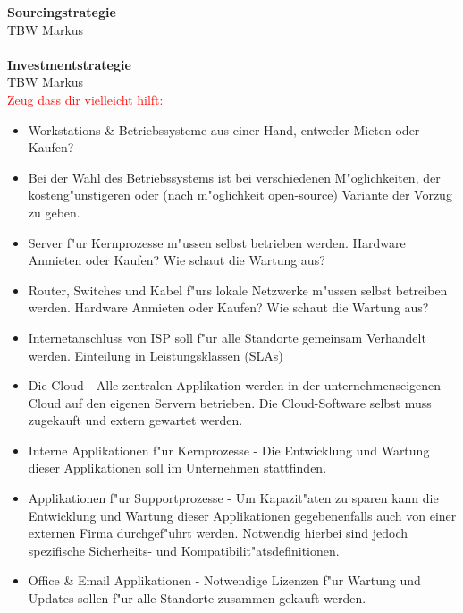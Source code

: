 \textbf{Sourcingstrategie}\\
TBW Markus\\\\

\textbf{Investmentstrategie}\\
TBW Markus\\

\textcolor{red}{Zeug dass dir vielleicht hilft:}\\

\begin{itemize}

	\item Workstations \& Betriebssysteme aus einer Hand, entweder Mieten oder Kaufen?

	\item Bei der Wahl des Betriebssystems ist bei verschiedenen M"oglichkeiten, der kosteng"unstigeren oder (nach m"oglichkeit open-source) Variante der Vorzug zu geben.
	
	\item Server f"ur Kernprozesse m"ussen selbst betrieben werden. Hardware Anmieten oder Kaufen? Wie schaut die Wartung aus?
	
	\item Router, Switches und Kabel f"urs lokale Netzwerke m"ussen selbst betreiben werden. Hardware Anmieten oder Kaufen? Wie schaut die Wartung aus?
	
	\item Internetanschluss von ISP soll f"ur alle Standorte gemeinsam Verhandelt werden. Einteilung in Leistungsklassen (SLAs)

	\item Die Cloud - Alle zentralen Applikation werden in der unternehmenseigenen Cloud auf den eigenen Servern betrieben. Die Cloud-Software selbst  muss zugekauft und extern gewartet werden.
	
	\item Interne Applikationen f"ur Kernprozesse - Die Entwicklung und Wartung dieser Applikationen soll im Unternehmen stattfinden.
	
	\item Applikationen f"ur Supportprozesse -  Um Kapazit"aten zu sparen kann die Entwicklung und Wartung dieser Applikationen gegebenenfalls auch von einer externen Firma durchgef"uhrt werden. Notwendig hierbei sind jedoch spezifische Sicherheits- und Kompatibilit"atsdefinitionen. 
	
	\item Office \& Email Applikationen - Notwendige Lizenzen f"ur Wartung und Updates sollen f"ur alle Standorte zusammen gekauft werden.
	

\end{itemize}
